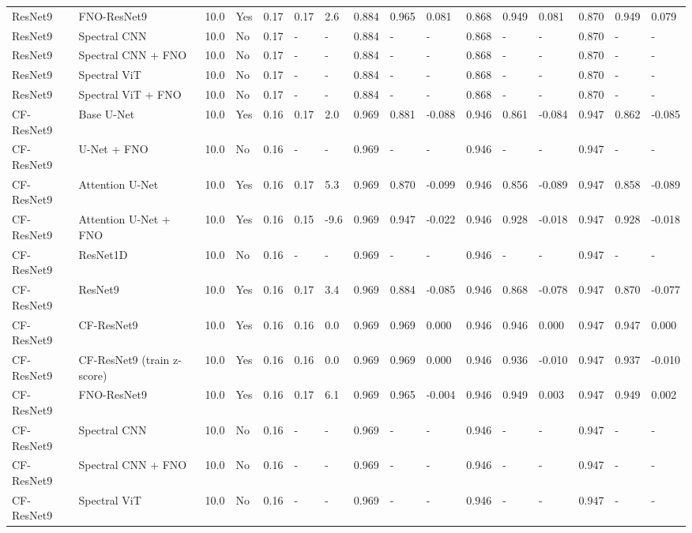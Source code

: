 \begin{longtable}{llllllllllllllll}
ResNet9 & FNO-ResNet9 & 10.0 & Yes & 0.17 & 0.17 & 2.6 & 0.884 & 0.965 & 0.081 & 0.868 & 0.949 & 0.081 & 0.870 & 0.949 & 0.079 \\
ResNet9 & Spectral CNN & 10.0 & No & 0.17 & - & - & 0.884 & - & - & 0.868 & - & - & 0.870 & - & - \\
ResNet9 & Spectral CNN + FNO & 10.0 & No & 0.17 & - & - & 0.884 & - & - & 0.868 & - & - & 0.870 & - & - \\
ResNet9 & Spectral ViT & 10.0 & No & 0.17 & - & - & 0.884 & - & - & 0.868 & - & - & 0.870 & - & - \\
ResNet9 & Spectral ViT + FNO & 10.0 & No & 0.17 & - & - & 0.884 & - & - & 0.868 & - & - & 0.870 & - & - \\
CF-ResNet9 & Base U-Net & 10.0 & Yes & 0.16 & 0.17 & 2.0 & 0.969 & 0.881 & -0.088 & 0.946 & 0.861 & -0.084 & 0.947 & 0.862 & -0.085 \\
CF-ResNet9 & U-Net + FNO & 10.0 & No & 0.16 & - & - & 0.969 & - & - & 0.946 & - & - & 0.947 & - & - \\
CF-ResNet9 & Attention U-Net & 10.0 & Yes & 0.16 & 0.17 & 5.3 & 0.969 & 0.870 & -0.099 & 0.946 & 0.856 & -0.089 & 0.947 & 0.858 & -0.089 \\
CF-ResNet9 & Attention U-Net + FNO & 10.0 & Yes & 0.16 & 0.15 & -9.6 & 0.969 & 0.947 & -0.022 & 0.946 & 0.928 & -0.018 & 0.947 & 0.928 & -0.018 \\
CF-ResNet9 & ResNet1D & 10.0 & No & 0.16 & - & - & 0.969 & - & - & 0.946 & - & - & 0.947 & - & - \\
CF-ResNet9 & ResNet9 & 10.0 & Yes & 0.16 & 0.17 & 3.4 & 0.969 & 0.884 & -0.085 & 0.946 & 0.868 & -0.078 & 0.947 & 0.870 & -0.077 \\
CF-ResNet9 & CF-ResNet9 & 10.0 & Yes & 0.16 & 0.16 & 0.0 & 0.969 & 0.969 & 0.000 & 0.946 & 0.946 & 0.000 & 0.947 & 0.947 & 0.000 \\
CF-ResNet9 & CF-ResNet9 (train z-score) & 10.0 & Yes & 0.16 & 0.16 & 0.0 & 0.969 & 0.969 & 0.000 & 0.946 & 0.936 & -0.010 & 0.947 & 0.937 & -0.010 \\
CF-ResNet9 & FNO-ResNet9 & 10.0 & Yes & 0.16 & 0.17 & 6.1 & 0.969 & 0.965 & -0.004 & 0.946 & 0.949 & 0.003 & 0.947 & 0.949 & 0.002 \\
CF-ResNet9 & Spectral CNN & 10.0 & No & 0.16 & - & - & 0.969 & - & - & 0.946 & - & - & 0.947 & - & - \\
CF-ResNet9 & Spectral CNN + FNO & 10.0 & No & 0.16 & - & - & 0.969 & - & - & 0.946 & - & - & 0.947 & - & - \\
CF-ResNet9 & Spectral ViT & 10.0 & No & 0.16 & - & - & 0.969 & - & - & 0.946 & - & - & 0.947 & - & - \\

\end{longtable}
